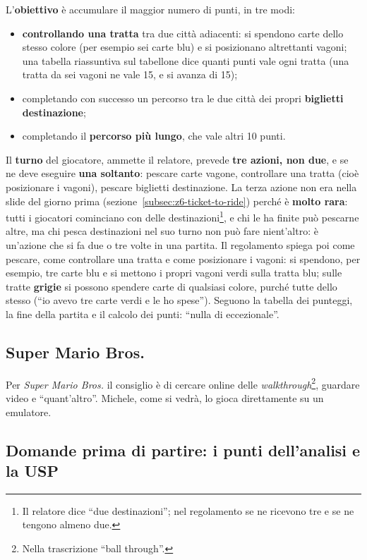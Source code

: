 L'\textbf{obiettivo} è accumulare il maggior numero di punti, in tre modi:
\begin{itemize}
  \item \textbf{controllando una tratta} tra due città adiacenti: si spendono
        carte dello stesso colore (per esempio sei carte blu) e si posizionano
        altrettanti vagoni; una tabella riassuntiva sul tabellone dice quanti
        punti vale ogni tratta (una tratta da sei vagoni ne vale 15, e si avanza
        di 15);
  \item completando con successo un percorso tra le due città dei propri
        \textbf{biglietti destinazione};
  \item completando il \textbf{percorso più lungo}, che vale altri 10 punti.
\end{itemize}

Il \textbf{turno} del giocatore, ammette il relatore, prevede \textbf{tre azioni,
non due}, e se ne deve eseguire \textbf{una soltanto}: pescare carte vagone,
controllare una tratta (cioè posizionare i vagoni), pescare biglietti
destinazione. La terza azione non era nella slide del giorno prima
(sezione~\ref{subsec:z6-ticket-to-ride}) perché è \textbf{molto rara}: tutti i
giocatori cominciano con delle destinazioni\footnote{Il relatore dice ``due
destinazioni''; nel regolamento se ne ricevono tre e se ne tengono almeno
due.}, e chi le ha finite può pescarne altre, ma chi pesca destinazioni nel suo
turno non può fare nient'altro: è un'azione che si fa due o tre volte in una
partita. Il regolamento spiega poi come pescare, come controllare una tratta e
come posizionare i vagoni: si spendono, per esempio, tre carte blu e si mettono i
propri vagoni verdi sulla tratta blu; sulle tratte \textbf{grigie} si possono
spendere carte di qualsiasi colore, purché tutte dello stesso (``io avevo tre
carte verdi e le ho spese''). Seguono la tabella dei punteggi, la fine della
partita e il calcolo dei punti: ``nulla di eccezionale''.

\subsection{Super Mario Bros.}

Per \emph{Super Mario Bros.} il consiglio è di cercare online delle
\emph{walkthrough}\footnote{Nella trascrizione ``ball through''.}, guardare
video e ``quant'altro''. Michele, come si vedrà, lo gioca direttamente su un
emulatore.

\subsection{Domande prima di partire: i punti dell'analisi e la USP}

